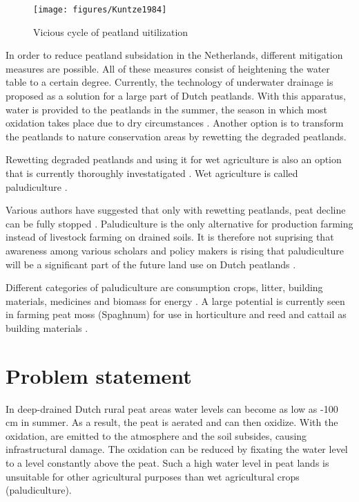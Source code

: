 \documentclass[a4paper,12pt]{scrbook}
\begin{document}
\begin{figure}
    \centering
    \texttt{[image: figures/Kuntze1984]} 
    \caption{Vicious cycle of peatland uitilization}
    \label{fig:peatlanduti}
\end{figure}


In order to reduce peatland subsidation in the Netherlands, different mitigation measures are possible. All of these measures consist of heightening the water table to a certain degree. Currently, the technology of underwater drainage is proposed as a solution for a large part of Dutch peatlands. With this apparatus, water is provided to the peatlands in the summer, the season in which most oxidation takes place due to dry circumstances \citep{van2011huidige}. Another option is to transform the peatlands to nature conservation areas by rewetting the degraded peatlands. 

Rewetting degraded peatlands and using it for wet agriculture is also an option that is currently thoroughly investatigated \citep{Wichmann20151063}. Wet agriculture is called paludiculture \citep{joosten2002wise}. 


Various authors have suggested that only with rewetting peatlands, peat decline can be fully stopped \citep{van2016dalende, wichtmann2016paludiculture}. Paludiculture is the only alternative for production farming instead of livestock farming on drained soils. It is therefore not suprising that awareness among various scholars and policy makers is rising that paludiculture will be a significant part of the future land use on Dutch peatlands \citep{abel2013database, wichtmann2016paludiculture, Wichmann20151063}. 

Different categories of paludiculture are consumption crops, litter, building materials, medicines and biomass for energy \citep{wichtmann2016paludiculture}. A large potential is currently seen in farming peat moss (Spaghnum) for use in horticulture and reed and cattail as building materials \citep{wichtmann2016paludiculture}.

\section{Problem statement}
In deep-drained Dutch rural peat areas water levels can become as low as -100 cm in summer. As a result, the peat is aerated and can then oxidize. With the oxidation,  are emitted to the atmosphere and the soil subsides, causing infrastructural damage. The oxidation can be reduced by fixating the water level to a level constantly above the peat. Such a high water level in peat lands is unsuitable for other agricultural purposes than wet agricultural crops (paludiculture). 
\end{document}
